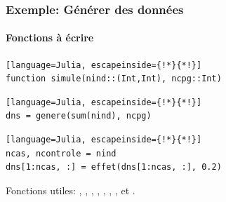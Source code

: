 \begin{frame}[fragile]
    \frametitle{\textcolor{goldenrod2}{Exemple:} Générer des données}
    \framesubtitle{Fonctions à écrire}
    \begin{description}
\begin{lstlisting}[language=Julia, escapeinside={!*}{*!}]
function simule(nind::(Int,Int), ncpg::Int)
\end{lstlisting}
\vspace{-3ex}
\begin{lstlisting}[language=Julia, escapeinside={!*}{*!}]
dns = genere(sum(nind), ncpg)
\end{lstlisting}

\begin{lstlisting}[language=Julia, escapeinside={!*}{*!}]
ncas, ncontrole = nind
dns[1:ncas, :] = effet(dns[1:ncas, :], 0.2)
\end{lstlisting}
    \end{description}
    \par{Fonctions utiles: , , , , , , , \cmdb{\textquotesingle} et .}
\end{frame}


